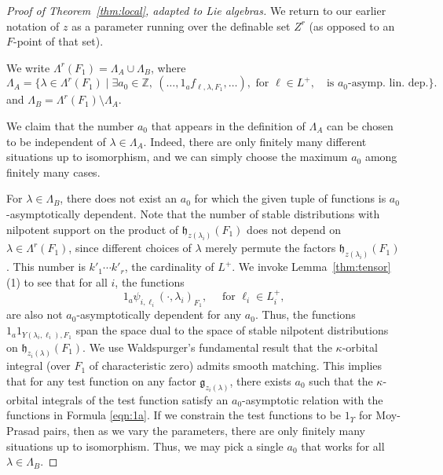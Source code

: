 \documentclass[12pt]{amsart}
\newcommand{\ring}[1]{{\mathbb #1}}
\def\Y{\Upsilon}
\newcommand{\fg}{\mathfrak{g}}
\newcommand{\fh}{\mathfrak{h}}
\theoremstyle{plain}
\theoremstyle{definition}
\begin{document}
\begin{proof}[Proof of Theorem~\ref{thm:local}, adapted to Lie algebras]
We return to our earlier notation of $z$ as a
parameter running over the definable set $Z^r$ (as opposed to an $F$-point
of that set).

We write $\Lambda^r(F_1) = \Lambda_A \cup\Lambda_B$, where
\[
\Lambda_A = \{\lambda\in\Lambda^r(F_1)\mid
\exists a_0\in\ring{Z},\ (\ldots,1_af_{\ell,\lambda,F_1},\ldots), \text{ for } \ell\in L^+,
\quad\text{is } a_0\text{-asymp. lin. dep.} \}.
\]
and $\Lambda_B = \Lambda^r(F_1)\setminus \Lambda_A$.  

We claim that the number $a_0$ that appears in the definition of $\Lambda_A$
can be chosen to be independent of $\lambda\in\Lambda_A$.  Indeed,
there are only finitely many different situations up to isomorphism,
and we can simply choose the maximum $a_0$ among finitely many cases.

For $\lambda\in \Lambda_B$, there does not exist an $a_0$ for which
the given tuple of functions is $a_0$-asymptotically dependent.  Note
that the number of stable distributions with nilpotent support on the
product of $\fh_{z(\lambda_i)}(F_1)$ does not depend on $\lambda\in
\Lambda^r(F_1)$, since different choices of $\lambda$ merely permute
the factors $\fh_{z(\lambda_i)}(F_1)$.  This number is $k'_1\cdots k'_r$,
the cardinality of $L^+$.  We invoke Lemma~\ref{thm:tensor}(1) to see
that for all $i$, the functions
\begin{equation}\label{eqn:1a}
1_a\psi_{i,\ell_i}(\cdot,\lambda_i)_{F_1},\quad \text{ for }\ell_i\in L^+_i,
\end{equation}
are also not $a_0$-asymptotically dependent for any $a_0$.  Thus, the
functions $1_a 1_{Y(\lambda_i,\ell_i),F_1}$ span the space dual to the
space of stable nilpotent distributions on $\fh_{z_i(\lambda)}(F_1)$.
We use Waldspurger's fundamental result \cite{waldspurger1997lemme}
that the $\kappa$-orbital integral (over $F_1$ of characteristic zero)
admits smooth matching. This implies that for any test function on any
factor $\fg_{z_i(\lambda)}$, there exists $a_0$ such that the
$\kappa$-orbital integrals of the test function satisfy an
$a_0$-asymptotic relation with the functions in Formula \ref{eqn:1a}.
If we constrain the test functions to be $1_\Y$ for Moy-Prasad pairs,
then as we vary the parameters, there are only finitely many
situations up to isomorphism.  Thus, we may pick a single $a_0$ that
works for all $\lambda\in\Lambda_B$.


\end{proof}
\end{document}
